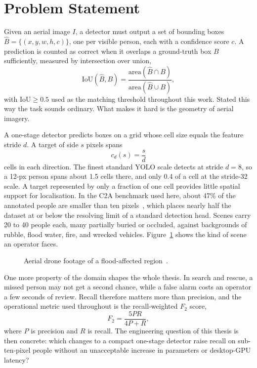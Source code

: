 \documentclass[12pt,a4paper,oneside]{report}
\begin{document}
\section{Problem Statement}
Given an aerial image $I$, a detector must output a set of bounding boxes
$\hat{B} = \{(x, y, w, h, c)\}$, one per visible person, each with a confidence
score $c$. A prediction is counted as correct when it overlaps a ground-truth
box $B$ sufficiently, measured by intersection over union,
\begin{equation}
  \mathrm{IoU}(\hat{B}, B) =
    \frac{\mathrm{area}(\hat{B} \cap B)}{\mathrm{area}(\hat{B} \cup B)},
  \label{eq:iou}
\end{equation}
with $\mathrm{IoU} \geq 0.5$ used as the matching threshold throughout this
work. Stated this way the task sounds ordinary. What makes it hard is the
geometry of aerial imagery.

A one-stage detector predicts boxes on a grid whose cell size equals the
feature stride $d$. A target of side $s$ pixels spans
\begin{equation}
  c_d(s) = \frac{s}{d}
  \label{eq:coverage}
\end{equation}
cells in each direction. The finest standard YOLO scale detects at stride
$d = 8$, so a 12-px person spans about 1.5 cells there, and only 0.4 of a cell
at the stride-32 scale. A target represented by only a fraction of one cell
provides little spatial support for localisation. In the C2A benchmark used here, about 47\% of the
annotated people are smaller than ten pixels~\cite{nihal2024c2a}, which places
nearly half the dataset at or below the resolving limit of a standard
detection head. Scenes carry 20 to 40 people each, many partially buried or
occluded, against backgrounds of rubble, flood water, fire, and wrecked
vehicles. Figure~\ref{fig:introscene} shows the kind of scene an operator
faces.

\begin{figure}[tbp]
  \centering
  \caption{Aerial drone footage of a flood-affected region~\cite{agiindia2024drones}.}
  \label{fig:introscene}
\end{figure}

One more property of the domain shapes the whole thesis. In search and rescue,
a missed person may not get a second chance, while a false alarm costs an
operator a few seconds of review. Recall therefore matters more than
precision, and the operational metric used throughout is the recall-weighted
$F_2$ score,
\begin{equation}
  F_2 = \frac{5PR}{4P + R},
  \label{eq:f2}
\end{equation}
where $P$ is precision and $R$ is recall. The engineering question of this
thesis is then concrete: which changes to a compact one-stage detector raise
recall on sub-ten-pixel people without an unacceptable increase in parameters
or desktop-GPU latency?
\end{document}
